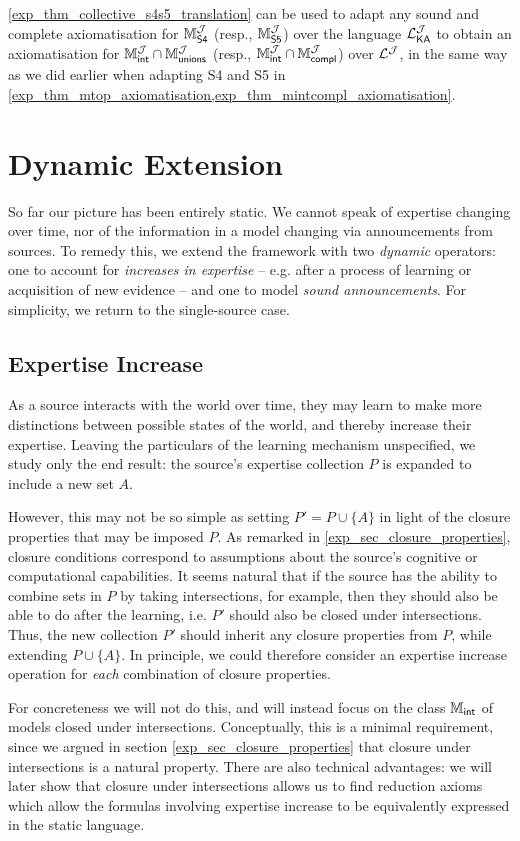 \cref{exp_thm_collective_s4s5_translation} can be used to adapt any sound and
complete axiomatisation for $\mathbb{M}^{\mathcal{J}}_{\mathsf{S4}}$ (resp., $\mathbb{M}^{\mathcal{J}}_{\mathsf{S5}}$) over
the language $\mathcal{L}_{\mathsf{K}\mathsf{A}}^{\mathcal{J}}$ to obtain an axiomatisation for $\mathbb{M}_{\mathsf{int}}^{\mathcal{J}} \cap
\mathbb{M}_{\mathsf{unions}}^{\mathcal{J}}$ (resp., $\mathbb{M}_{\mathsf{int}}^{\mathcal{J}} \cap \mathbb{M}_{\mathsf{compl}}^{\mathcal{J}}$) over $\mathcal{L}^{\mathcal{J}}$, in the
same way as we did earlier when adapting S4 and S5 in
\cref{exp_thm_mtop_axiomatisation,exp_thm_mintcompl_axiomatisation}.

\section{Dynamic Extension}
\label{exp_sec_dynamic_extension}

So far our picture has been entirely static. We cannot speak of expertise
changing over time, nor of the information in a model changing via
announcements from sources. To remedy this, we extend the framework with two
\emph{dynamic} operators: one to account for \emph{increases in expertise} --
e.g. after a process of learning or acquisition of new evidence -- and one to
model \emph{sound announcements}. For simplicity, we return to the
single-source case.

\subsection{Expertise Increase}

As a source interacts with the world over time, they may learn to make more
distinctions between possible states of the world, and thereby increase their
expertise. Leaving the particulars of the learning mechanism unspecified, we
study only the end result: the source's expertise collection $P$ is
expanded to include a new set $A$.

However, this may not be so simple as setting $P' = P \cup \{A\}$ in light of
the closure properties that may be imposed $P$. As remarked in
\cref{exp_sec_closure_properties}, closure conditions correspond to assumptions
about the source's cognitive or computational capabilities. It seems natural
that if the source has the ability to combine sets in $P$ by taking
intersections, for example, then they should also be able to do after the
learning, i.e.  $P'$ should also be closed under intersections. Thus, the new
collection $P'$ should inherit any closure properties from $P$, while extending
$P \cup \{A\}$. In principle, we could therefore consider an expertise increase
operation for \emph{each} combination of closure properties.

For concreteness we will not do this, and will instead focus on the class
$\mathbb{M}_{\mathsf{int}}$ of models closed under intersections. Conceptually, this is a minimal
requirement, since we argued in section \cref{exp_sec_closure_properties} that
closure under intersections is a natural property. There are also technical
advantages: we will later show that closure under intersections allows us to
find reduction axioms which allow the formulas involving expertise increase to
be equivalently expressed in the static language.

